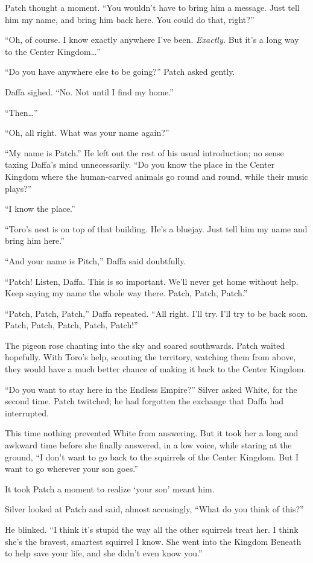 \documentclass[ebook,oneside,openany,12pt]{memoir}
\begin{document}
Patch thought a moment. “You wouldn’t have to bring him a
message. Just tell him my name, and bring him back here. You could do
that, right?”

“Oh, of course. I know exactly anywhere I’ve been. \emph{Exactly.}
But it’s a long way to the Center Kingdom…”

“Do you have anywhere else to be going?” Patch asked gently.

Daffa sighed. “No. Not until I find my home.”

“Then…”

“Oh, all right. What was your name again?”

“My name is Patch.” He left out the rest of his usual introduction; no
sense taxing Daffa’s mind unnecessarily. “Do you know the place in the
Center Kingdom where the human-carved animals go round and round,
while their music plays?”

“I know the place.”

“Toro’s nest is on top of that building. He’s a bluejay. Just tell him
my name and bring him here.”

“And your name is Pitch,” Daffa said doubtfully.

“Patch! Listen, Daffa. This is so important. We’ll never get home
without help. Keep saying my name the whole way there. Patch, Patch,
Patch.”

“Patch, Patch, Patch,” Daffa repeated. “All right. I’ll try. I’ll try
to be back soon. Patch, Patch, Patch, Patch, Patch!”

The pigeon rose chanting into the sky and soared southwards. Patch
waited hopefully. With Toro’s help, scouting the territory, watching
them from above, they would have a much better chance of making it
back to the Center Kingdom.

“Do you want to stay here in the Endless Empire?” Silver asked White,
for the second time. Patch twitched; he had forgotten the exchange
that Daffa had interrupted.

This time nothing prevented White from answering. But it took her a
long and awkward time before she finally answered, in a low voice,
while staring at the ground, “I don’t want to go back to the squirrels
of the Center Kingdom. But I want to go wherever your son goes.”

It took Patch a moment to realize ‘your son’ meant him.

Silver looked at Patch and said, almost accusingly, “What do you think
of this?”

He blinked. “I think it’s stupid the way all the other squirrels treat
her. I think she’s the bravest, smartest squirrel I know. She went
into the Kingdom Beneath to help save your life, and she didn’t even
know you.”
\end{document}
